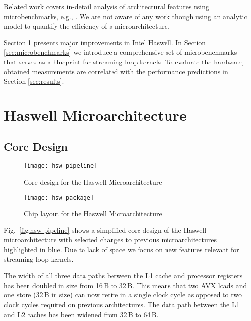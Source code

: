 \documentclass{llncs}
\begin{document}
Related work covers in-detail analysis of architectural features using
microbenchmarks, e.g., \cite{Molka:2015,Molka:2014,Schone:2012}.  We are not
aware of any work though using an analytic model to quantify the efficiency of
a microarchitecture.

Section \ref{sec:intro_haswell}  presents major improvements in Intel Haswell.  In
Section \ref{sec:microbenchmarks} we introduce a comprehensive set of
microbenchmarks that serves as a blueprint for streaming loop kernels. To
evaluate the hardware, obtained measurements are correlated with the
performance predictions in Section \ref{sec:results}.

\section{Haswell Microarchitecture}
\label{sec:intro_haswell}

\subsection{Core Design}

\begin{figure}[tb]
\begin{minipage}{.49\textwidth}
    \centering
    \texttt{[image: hsw-pipeline]}
    \caption{Core design for the Haswell Microarchitecture}
    \label{fig:hsw-pipeline}
\end{minipage}\hfill
\begin{minipage}{.49\textwidth}
    \centering
    \texttt{[image: hsw-package]}
    \caption{Chip layout for the Haswell Microarchitecture}
    \label{fig:hsw-package}
\end{minipage}
\end{figure}


Fig.~\ref{fig:hsw-pipeline} shows a simplified core design of the Haswell
microarchitecture with selected changes to previous
microarchitectures highlighted in blue. Due to lack of space we focus on
new features relevant for streaming loop kernels.

The width of all three data paths between the L1 cache and processor registers
has been doubled in size from 16\,B to 32\,B.  This means that two \ac{AVX} loads
and one store (32\,B in size) can now retire in a single clock cycle as opposed to
two clock cycles required on previous architectures. The data
path between the L1 and L2 caches has been widened from 32\,B to 64\,B.
\end{document}
